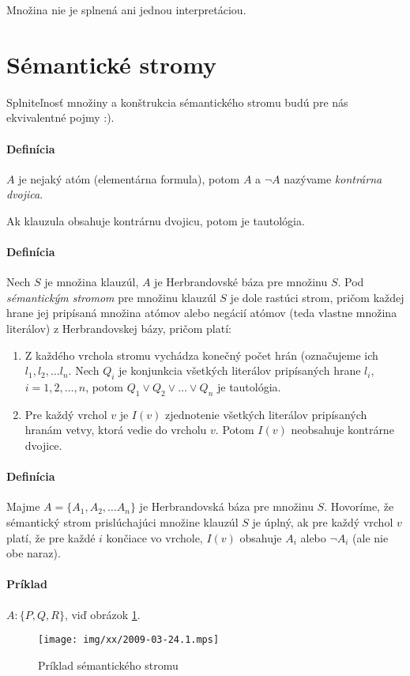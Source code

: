 Množina nie je splnená ani jednou interpretáciou.

\section{Sémantické stromy}
Splniteľnosť množiny a konštrukcia sémantického stromu budú pre nás ekvivalentné
pojmy :).

\paragraph{Definícia} $A$ je nejaký atóm (elementárna formula), potom $A$ a
$\neg A$ nazývame \emph{kontrárna dvojica}.

\par  Ak klauzula obsahuje kontrárnu dvojicu, potom je tautológia.

\paragraph{Definícia} Nech $S$ je množina klauzúl, $A$ je Herbrandovské báza pre
množinu $S$. Pod \emph{sémantickým stromom} pre množinu klauzúl $S$ je dole
rastúci strom, pričom každej hrane jej pripísaná množina atómov alebo negácií
atómov (teda vlastne množina literálov) z Herbrandovskej bázy, pričom platí:
\begin{enumerate}
	\item Z každého vrchola stromu vychádza konečný počet hrán (označujeme
	ich $l_1, l_2, \ldots l_n$. Nech $Q_i$ je konjunkcia všetkých literálov
	pripísaných hrane $l_i$, $i=1,2,\ldots,n$, potom $Q_1 \lor Q_2 \lor
	\ldots \lor Q_n$ je tautológia.
	\item Pre každý vrchol $v$ je $I(v)$ zjednotenie všetkých literálov
	pripísaných hranám vetvy, ktorá vedie do vrcholu $v$. Potom $I(v)$
	neobsahuje kontrárne dvojice.
\end{enumerate}


\paragraph{Definícia} Majme $A=\{ A_1, A_2, \ldots A_n \}$ je Herbrandovská báza
pre množinu $S$. Hovoríme, že sémantický strom prislúchajúci množine klauzúl $S$
je úplný, ak pre každý vrchol $v$ platí, že pre každé $i$ končiace vo vrchole,
$I(v)$ obsahuje $A_i$ alebo $\neg A_i$ (ale nie obe naraz).

\paragraph{Príklad} $A: \{ P, Q, R \}$, viď obrázok
\ref{fig-semantic_tree_example}.
\begin{figure}[h]
	\caption{Príklad sémantického stromu}
	\centering\texttt{[image: img/xx/2009-03-24.1.mps]}
	\label{fig-semantic_tree_example}
\end{figure}



